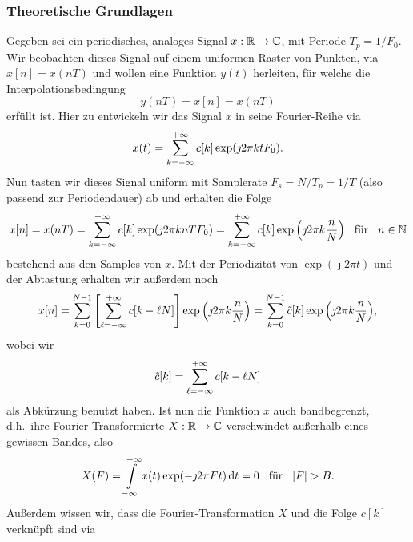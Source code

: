 %
%
\subsubsection{Theoretische Grundlagen}
%
Gegeben sei ein periodisches, analoges Signal $x: \mathbb{R} \rightarrow \mathbb{C}$, mit Periode $T_p = 1/F_0$. Wir beobachten dieses Signal auf einem uniformen Raster von Punkten, via $x[n] = x(n T)$ und wollen eine Funktion $y(t)$ herleiten, f\"ur welche die Interpolationsbedingung
\begin{equation}\label{eq:dftintp:eadf_interpol_cond}
    y(nT) = x[n] = x(nT)
\end{equation}
erf\"ullt ist. Hier zu entwickeln wir das Signal $x$ in seine Fourier-Reihe via
\begin{equation}\label{eq:dftintp:fourier_series}
    x(t) = {\sum\limits_{k=-\infty}^{+\infty}{
        c[k] \exp(\jmath 2 \pi k t F_0) 
    }}.
\end{equation}
Nun tasten wir dieses Signal uniform mit Samplerate $F_s = N/T_p = 1/T$ (also passend zur Periodendauer) ab und erhalten die Folge 
\begin{equation}
    x[n] = x(n T) = {\sum\limits_{k=-\infty}^{+\infty}{
        c[k] \exp(\jmath 2 \pi k n T F_0) 
    }} = {\sum\limits_{k=-\infty}^{+\infty}{
        c[k] \exp\left(\jmath 2 \pi k \frac nN\right) 
    }}
    {\hspace{3mm} \text{f\"ur} \hspace{3mm}}
    n \in \mathbb{N}
\end{equation}
bestehend aus den Samples von $x$. Mit der Periodizit\"at von $\exp(\jmath 2 \pi t)$ und der Abtastung erhalten wir au{\ss}erdem noch
\begin{equation}
    x[n] = {\sum\limits_{k=0}^{N-1}{
        \left[{\sum\limits_{\ell=-\infty}^{+\infty}{
            c[k - \ell N]
        }}\right] \exp\left(\jmath 2 \pi k \frac nN\right) 
    }} = {\sum\limits_{k=0}^{N-1}{
        \tilde{c}[k] \exp\left(\jmath 2 \pi k \frac nN\right) 
    }},
\end{equation}
wobei wir 
\begin{equation}\label{eq:dftintp:aliased_ck}
    \tilde{c}[k] = {\sum\limits_{\ell=-\infty}^{+\infty}{
        c[k - \ell N]
    }}
\end{equation}
als Abk\"urzung benutzt haben. Ist nun die Funktion $x$ auch bandbegrenzt, d.h.~ihre Fourier-Transformierte $X : \mathbb{R} \rightarrow \mathbb{C}$ verschwindet au{\ss}erhalb eines gewissen Bandes, also
\begin{equation}
    X(F) = {\int\limits_{-\infty}^{+\infty}{x(t) \exp(-\jmath 2 \pi F t )}\,\mathrm{d}{t}} = 0 {\hspace{3mm} \text{f\"ur} \hspace{3mm}} {\left| F \right|} > B.
\end{equation}
Au{\ss}erdem wissen wir, dass die Fourier-Transformation $X$ und die Folge $c[k]$ verkn\"upft sind via 
